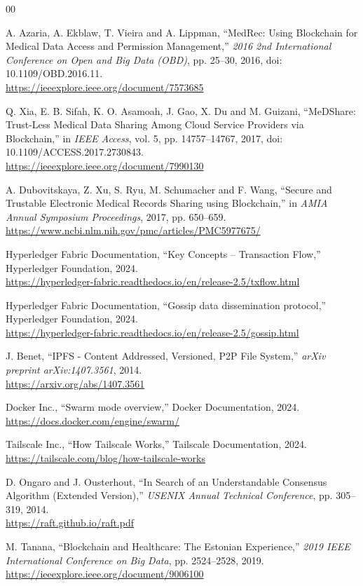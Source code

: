 \begin{thebibliography}{00}

 A. Azaria, A. Ekblaw, T. Vieira and A. Lippman, ``MedRec: Using Blockchain for Medical Data Access and Permission Management,'' \textit{2016 2nd International Conference on Open and Big Data (OBD)}, pp. 25--30, 2016, doi: 10.1109/OBD.2016.11.\\
\url{https://ieeexplore.ieee.org/document/7573685}

 Q. Xia, E. B. Sifah, K. O. Asamoah, J. Gao, X. Du and M. Guizani, ``MeDShare: Trust-Less Medical Data Sharing Among Cloud Service Providers via Blockchain,'' in \textit{IEEE Access}, vol. 5, pp. 14757--14767, 2017, doi: 10.1109/ACCESS.2017.2730843.\\
\url{https://ieeexplore.ieee.org/document/7990130}

 A. Dubovitskaya, Z. Xu, S. Ryu, M. Schumacher and F. Wang, ``Secure and Trustable Electronic Medical Records Sharing using Blockchain,'' in \textit{AMIA Annual Symposium Proceedings}, 2017, pp. 650--659.\\
\url{https://www.ncbi.nlm.nih.gov/pmc/articles/PMC5977675/}

 Hyperledger Fabric Documentation, ``Key Concepts -- Transaction Flow,'' Hyperledger Foundation, 2024.\\
\url{https://hyperledger-fabric.readthedocs.io/en/release-2.5/txflow.html}

 Hyperledger Fabric Documentation, ``Gossip data dissemination protocol,'' Hyperledger Foundation, 2024.\\
\url{https://hyperledger-fabric.readthedocs.io/en/release-2.5/gossip.html}

 J. Benet, ``IPFS - Content Addressed, Versioned, P2P File System,'' \textit{arXiv preprint arXiv:1407.3561}, 2014.\\
\url{https://arxiv.org/abs/1407.3561}

 Docker Inc., ``Swarm mode overview,'' Docker Documentation, 2024.\\
\url{https://docs.docker.com/engine/swarm/}

 Tailscale Inc., ``How Tailscale Works,'' Tailscale Documentation, 2024.\\
\url{https://tailscale.com/blog/how-tailscale-works}

 D. Ongaro and J. Ousterhout, ``In Search of an Understandable Consensus Algorithm (Extended Version),'' \textit{USENIX Annual Technical Conference}, pp. 305--319, 2014.\\
\url{https://raft.github.io/raft.pdf}

 M. Tanana, ``Blockchain and Healthcare: The Estonian Experience,'' \textit{2019 IEEE International Conference on Big Data}, pp. 2524--2528, 2019.\\
\url{https://ieeexplore.ieee.org/document/9006100}

\end{thebibliography}

